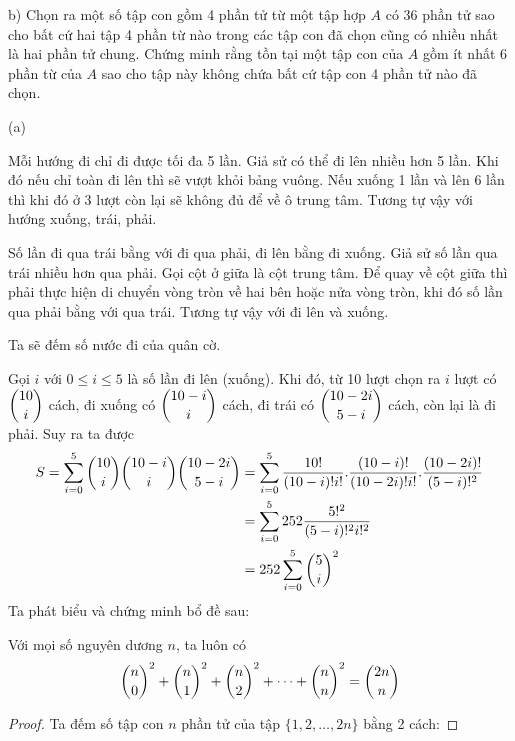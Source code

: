 \documentclass[11pt]{scrartcl}
\begin{document}
\begin{itemize}[label=, leftmargin=0em, itemsep=0.5em]
\begin{bt}
        b) Chọn ra một số tập con gồm 4 phần tử từ một tập hợp $A$ có 36 phần tử sao cho bất cứ hai tập 4 phần từ nào trong các tập con đã chọn cũng có nhiều nhất là hai phần tử chung. Chứng minh rằng tồn tại một tập con của $A$ gồm ít nhất 6 phần từ của $A$ sao cho tập này không chứa bất cứ tập con 4 phần tử nào đã chọn.
    \end{bt}
    \begin{sol}

        (a) 
        
         Mỗi hướng đi chỉ đi được tối đa 5 lần. Giả sử có thể đi lên nhiều hơn 5 lần. Khi đó nếu chỉ toàn đi lên thì sẽ vượt khỏi bảng vuông. Nếu xuống 1 lần và lên 6 lần thì khi đó ở 3 lượt còn lại sẽ không đủ để về ô trung tâm. Tương tự vậy với hướng xuống, trái, phải.

         Số lần đi qua trái bằng với đi qua phải, đi lên bằng đi xuống. Giả sử số lần qua trái nhiều hơn qua phải. Gọi cột ở giữa là cột trung tâm. Để quay về cột giữa thì phải thực hiện di chuyển vòng tròn về hai bên hoặc nửa vòng tròn, khi đó số lần qua phải bằng với qua trái. Tương tự vậy với đi lên và xuống.

        Ta sẽ đếm số nước đi của quân cờ. 

        Gọi $i$ với $0 \leq i \leq 5$  là số lần đi lên (xuống). Khi đó, từ 10 lượt chọn ra $i$ lượt có $\displaystyle\binom{10}{i}$ cách, đi xuống có $\displaystyle\binom{10 - i}{i}$ cách, đi trái có $\displaystyle\binom{10 - 2i}{5 - i}$ cách, còn lại là đi phải. Suy ra ta được 
        \[
        \begin{aligned}
            S = \dsum_{i = 0}^5 \dbi{10}{i}\dbi{10 - i}{i}\dbi{10 - 2i}{5 - i} &=  \dsum_{i = 0}^5\frac{10!}{(10 - i)!i!}. \frac{(10 - i)!}{(10 - 2i)!i!}.\frac{(10 - 2i )!}{(5 - i)!^2}\\
            &=\dsum_{i = 0}^5 252 \frac{5!^2}{(5 - i)!^2 i!^2}\\
            &= 252 \dsum_{i = 0}^5 \dbi{5}{i}^2
        \end{aligned}
        \]
        Ta phát biểu và chứng minh bổ đề sau: 
        \begin{lemma}
            Với mọi số nguyên dương $n$, ta luôn có 
            \[
                \displaystyle\binom{n}{0}^2 + \displaystyle\binom{n}{1}^2 + \displaystyle\binom{n}{2}^2 + \dots + \displaystyle\binom{n}{n}^2 = \displaystyle\binom{2n}{n}
            \]
        \end{lemma}
        \begin{proof}
            Ta đếm số tập con $n$ phần tử của tập $\{1,2,\dots,2n\}$ bằng 2 cách:


\end{proof}
\end{sol}
\end{itemize}
\end{document}
